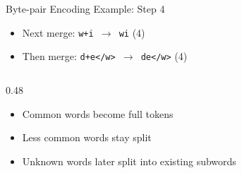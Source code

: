 \documentclass[aspectratio=169,xcolor=dvipsnames,svgnames,x11names,fleqn]{beamer}
\begin{document}
\begin{frame}{Byte-pair Encoding Example: Step 4}
    \begin{itemize}
        \item[\faFastForward] \scriptsize Next merge: \textcolor{mergecolor}{\texttt{w+i $\rightarrow$ wi}} (4)
        \item[\faFastForward] \scriptsize Then merge: \textcolor{mergecolor}{\texttt{d+e</w> $\rightarrow$ de</w>}} (4)
    \end{itemize}
    
    \begin{columns}[T]
        \begin{column}{0.48\textwidth}
            \begin{tcolorbox}[colback=bpeIndigo!5, colframe=bpeIndigo, fonttitle=\bfseries\scriptsize]
                \scriptsize
                \begin{itemize}
                    \item Common words become full tokens
                    \item Less common words stay split
                    \item Unknown words later split into existing subwords
                \end{itemize}
            \end{tcolorbox}
        \end{column}
    \end{columns}
\end{frame}
\end{document}
